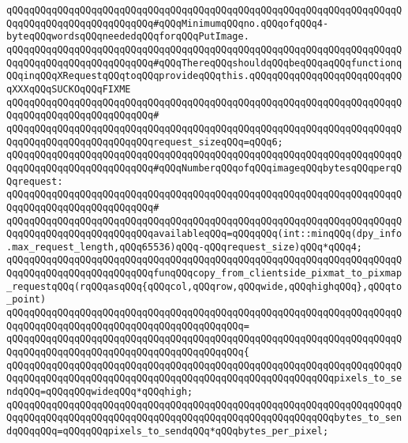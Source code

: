 \newline
\verb|qQQqqQQqqQQqqQQqqQQqqQQqqQQqqQQqqQQqqQQqqQQqqQQqqQQqqQQqqQQqqQQqqQQqqQQqqQQqqQQqqQQqqQQqqQQqqQQq#qQQqMinimumqQQqno.qQQqofqQQq4-byteqQQqwordsqQQqneededqQQqforqQQqPutImage.|\newline
\verb|qQQqqQQqqQQqqQQqqQQqqQQqqQQqqQQqqQQqqQQqqQQqqQQqqQQqqQQqqQQqqQQqqQQqqQQqqQQqqQQqqQQqqQQqqQQqqQQq#qQQqThereqQQqshouldqQQqbeqQQqaqQQqfunctionqQQqinqQQqXRequestqQQqtoqQQqprovideqQQqthis.qQQqqQQqqQQqqQQqqQQqqQQqqQQqXXXqQQqSUCKOqQQqFIXME|\newline
\verb|qQQqqQQqqQQqqQQqqQQqqQQqqQQqqQQqqQQqqQQqqQQqqQQqqQQqqQQqqQQqqQQqqQQqqQQqqQQqqQQqqQQqqQQqqQQqqQQq#|\newline
\verb|qQQqqQQqqQQqqQQqqQQqqQQqqQQqqQQqqQQqqQQqqQQqqQQqqQQqqQQqqQQqqQQqqQQqqQQqqQQqqQQqqQQqqQQqqQQqqQQqrequest_sizeqQQq=qQQq6;|\newline
\newline
\verb|qQQqqQQqqQQqqQQqqQQqqQQqqQQqqQQqqQQqqQQqqQQqqQQqqQQqqQQqqQQqqQQqqQQqqQQqqQQqqQQqqQQqqQQqqQQqqQQq#qQQqNumberqQQqofqQQqimageqQQqbytesqQQqperqQQqrequest:|\newline
\verb|qQQqqQQqqQQqqQQqqQQqqQQqqQQqqQQqqQQqqQQqqQQqqQQqqQQqqQQqqQQqqQQqqQQqqQQqqQQqqQQqqQQqqQQqqQQqqQQq#|\newline
\verb|qQQqqQQqqQQqqQQqqQQqqQQqqQQqqQQqqQQqqQQqqQQqqQQqqQQqqQQqqQQqqQQqqQQqqQQqqQQqqQQqqQQqqQQqqQQqqQQqavailableqQQq=qQQqqQQq(int::minqQQq(dpy_info.max_request_length,qQQq65536)qQQq-qQQqrequest_size)qQQq*qQQq4;|\newline
\newline
\verb|qQQqqQQqqQQqqQQqqQQqqQQqqQQqqQQqqQQqqQQqqQQqqQQqqQQqqQQqqQQqqQQqqQQqqQQqqQQqqQQqqQQqqQQqqQQqqQQqfunqQQqcopy_from_clientside_pixmat_to_pixmap_requestqQQq(rqQQqasqQQq{qQQqcol,qQQqrow,qQQqwide,qQQqhighqQQq},qQQqto_point)|\newline
\verb|qQQqqQQqqQQqqQQqqQQqqQQqqQQqqQQqqQQqqQQqqQQqqQQqqQQqqQQqqQQqqQQqqQQqqQQqqQQqqQQqqQQqqQQqqQQqqQQqqQQqqQQqqQQqqQQq=|\newline
\verb|qQQqqQQqqQQqqQQqqQQqqQQqqQQqqQQqqQQqqQQqqQQqqQQqqQQqqQQqqQQqqQQqqQQqqQQqqQQqqQQqqQQqqQQqqQQqqQQqqQQqqQQqqQQqqQQq{|\newline
\verb|qQQqqQQqqQQqqQQqqQQqqQQqqQQqqQQqqQQqqQQqqQQqqQQqqQQqqQQqqQQqqQQqqQQqqQQqqQQqqQQqqQQqqQQqqQQqqQQqqQQqqQQqqQQqqQQqqQQqqQQqqQQqqQQqpixels_to_sendqQQq=qQQqqQQqwideqQQq*qQQqhigh;|\newline
\verb|qQQqqQQqqQQqqQQqqQQqqQQqqQQqqQQqqQQqqQQqqQQqqQQqqQQqqQQqqQQqqQQqqQQqqQQqqQQqqQQqqQQqqQQqqQQqqQQqqQQqqQQqqQQqqQQqqQQqqQQqqQQqqQQqbytes_to_sendqQQqqQQq=qQQqqQQqpixels_to_sendqQQq*qQQqbytes_per_pixel;|\newline
